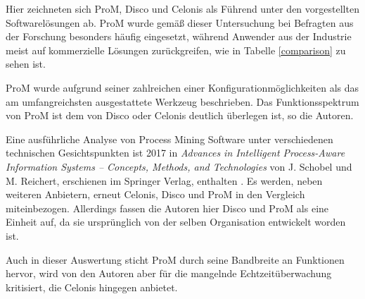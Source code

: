 Hier zeichneten sich ProM, Disco und Celonis als Führend unter den vorgestellten Softwarelösungen ab. ProM wurde gemäß dieser Untersuchung bei Befragten aus der Forschung besonders häufig eingesetzt, während Anwender aus der Industrie meist auf kommerzielle Lösungen zurückgreifen, wie in Tabelle \ref{comparison} zu sehen ist.

\begin{table}[!h]
\centering
{}
\caption{Angaben von Anwendern zu ihrem Umgang mit Process Mining Software (Quelle: Auszug aus Tabelle 5: Fragenkatalog 5, Verstraete, Comparative Study of Process Mining Software, S. 29 \cite{compPM} }
\label{comparison}
\end{table}

\normalsize
ProM wurde aufgrund seiner zahlreichen einer Konfigurationmöglichkeiten als das am umfangreichsten ausgestattete Werkzeug beschrieben. Das Funktionsspektrum von ProM ist dem von Disco oder Celonis deutlich überlegen ist, so die Autoren. 

Eine ausführliche Analyse von Process Mining Software unter verschiedenen technischen Gesichtspunkten ist 2017 in \textit{Advances in Intelligent Process-Aware Information Systems – Concepts, Methods, and Technologies} von J. Schobel und M. Reichert, erschienen im Springer Verlag, enthalten \cite{Schobel2017}. Es werden, neben weiteren Anbietern, erneut Celonis, Disco und ProM in den Vergleich miteinbezogen. Allerdings fassen die Autoren hier Disco und ProM als eine Einheit auf, da sie ursprünglich von der selben Organisation entwickelt worden ist. 

Auch in dieser Auswertung sticht ProM durch seine Bandbreite an Funktionen hervor, wird von den Autoren aber für die mangelnde Echtzeitüberwachung kritisiert, die Celonis hingegen anbietet.

